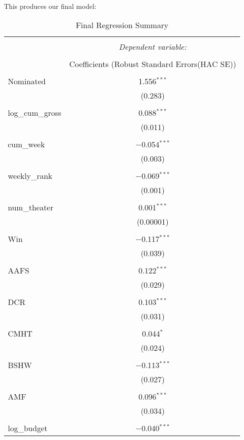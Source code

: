 \documentclass[11pt]{article} %
\begin{document}
This produces our final model: 
\begin{table}[!htbp] \centering 
\small
  \caption{Final Regression Summary} 
  \label{} 
\begin{tabular}{@{\extracolsep{5pt}}lc} 
\\[-1.8ex]\hline 
\hline \\[-1.8ex] 
 & \multicolumn{1}{c}{\textit{Dependent variable:}} \\ 
\cline{2-2} 
\\[-1.8ex] & Coefficients (Robust Standard Errors(HAC SE)) \\ 
\hline \\[-1.8ex] 
 Nominated & 1.556$^{***}$ \\ 
  & (0.283) \\ 
  & \\ 
 log\_cum\_gross & 0.088$^{***}$ \\ 
  & (0.011) \\ 
  & \\ 
 cum\_week & $-$0.054$^{***}$ \\ 
  & (0.003) \\ 
  & \\ 
 weekly\_rank & $-$0.069$^{***}$ \\ 
  & (0.001) \\ 
  & \\ 
 num\_theater & 0.001$^{***}$ \\ 
  & (0.00001) \\ 
  & \\ 
 Win & $-$0.117$^{***}$ \\ 
  & (0.039) \\ 
  & \\ 
 AAFS & 0.122$^{***}$ \\ 
  & (0.029) \\ 
  & \\ 
 DCR & 0.103$^{***}$ \\ 
  & (0.031) \\ 
  & \\ 
 CMHT & 0.044$^{*}$ \\ 
  & (0.024) \\ 
  & \\ 
 BSHW & $-$0.113$^{***}$ \\ 
  & (0.027) \\ 
  & \\ 
 AMF & 0.096$^{***}$ \\ 
  & (0.034) \\ 
  & \\ 
 log\_budget & $-$0.040$^{***}$ \\ 

\end{tabular}
\end{table}
\end{document}
